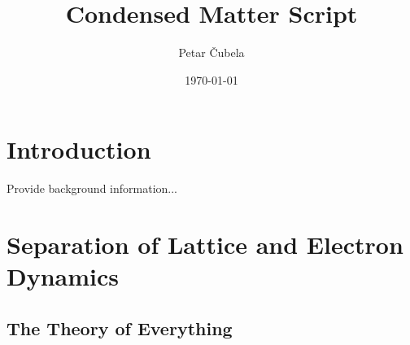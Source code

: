 \documentclass[11pt]{book}
\title{\Huge Condensed Matter Script}
\author{Petar \v{C}ubela}
\date{\today}
\begin{document}
\maketitle
\newpage
\tableofcontents
\newpage


\chapter{Introduction}\label{chapter1}

Provide background information...

\chapter{Separation of Lattice and Electron Dynamics}
\section{The Theory of Everything}
\end{document}
